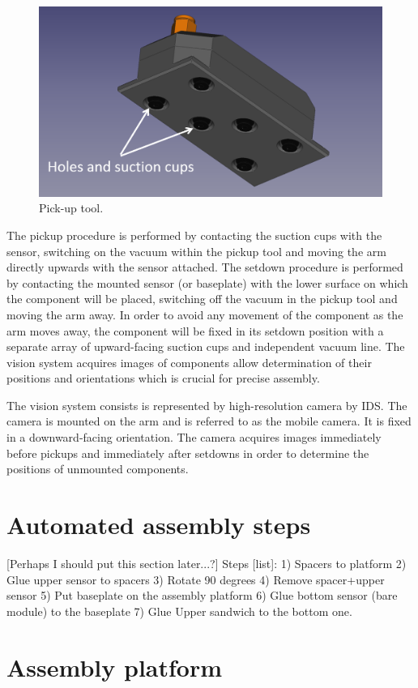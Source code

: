 \begin{figure}[ht]\centering
\includegraphics[width=0.7\linewidth]{Data/Module_assembly/Pick_up_tool.png}
\caption{Pick-up tool.}
\label{fig:pick_up_tool}
\end{figure}

The pickup procedure is performed by contacting the suction cups with the sensor, switching on the vacuum within the pickup tool and moving the arm directly upwards with the sensor attached. The setdown procedure is performed by contacting the mounted sensor (or baseplate) with the lower surface on which the component will be placed, switching off the vacuum in the pickup tool and moving the arm away. In order to avoid any movement of the component as the arm moves away, the component will be fixed in its setdown position with a separate array of upward-facing suction cups and independent vacuum line. The vision system acquires images of components allow determination of their positions and orientations which is crucial for precise assembly.

The vision system consists is represented by high-resolution camera by IDS. The camera is mounted on the arm and is referred to as the mobile camera. It is fixed in a downward-facing orientation. The camera acquires images immediately before pickups and immediately after setdowns in order to determine the positions of unmounted components. 

\section{Automated assembly steps}

[Perhaps I should put this section later...?]
Steps [list]:
1) Spacers to platform
2) Glue upper sensor to spacers
3) Rotate 90 degrees
4) Remove spacer+upper sensor
5) Put baseplate on the assembly platform
6) Glue bottom sensor (bare module) to the baseplate
7) Glue Upper sandwich to the bottom one.

\section{Assembly platform}

